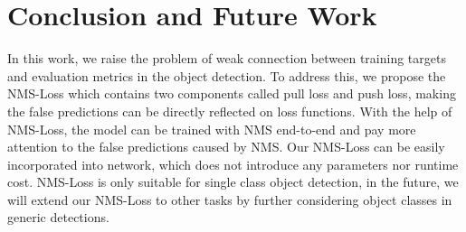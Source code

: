 \documentclass[sigconf]{acmart}
\begin{document}
\begin{table}[t]
\small
\caption{\textbf{Comparison between RepLoss and NMS-Loss on the CityPersons}. We use , , ,  to represent the  of baseline model,  of complete model,  of the improvement and relative improvement based on the baseline, respectively.}
\vspace{-1mm}
\begin{center}
\end{center}
\vspace{-3mm}
\label{table_impro_compare}
\end{table}





\section{Conclusion and Future Work}
In this work, we raise the problem of weak connection between training targets and evaluation metrics in the object detection. To address this, we propose the NMS-Loss which contains two components called pull loss and push loss, making the false predictions can be directly reflected on loss functions. With the help of NMS-Loss, the model can be trained with NMS end-to-end and pay more attention to the false predictions caused by NMS. Our NMS-Loss can be easily incorporated into network, which does not introduce any parameters nor runtime cost. NMS-Loss is only suitable for single class object detection, in the future, we will extend our NMS-Loss to other tasks by further considering object classes in generic detections.

\balance
\end{document}
